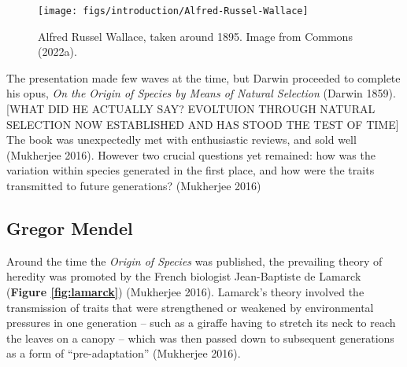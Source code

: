 \documentclass[
]{book}
\begin{document}
\begin{figure}

\texttt{[image: figs/introduction/Alfred-Russel-Wallace]} \hfill{}

\caption{Alfred Russel Wallace, taken around 1895. Image from Commons (2022a).}\label{fig:alfred-wallace}
\end{figure}

The presentation made few waves at the time, but Darwin proceeded to complete his opus, \emph{On the Origin of Species by Means of Natural Selection} (Darwin 1859). {[}WHAT DID HE ACTUALLY SAY? EVOLTUION THROUGH NATURAL SELECTION NOW ESTABLISHED AND HAS STOOD THE TEST OF TIME{]} The book was unexpectedly met with enthusiastic reviews, and sold well (Mukherjee 2016). However two crucial questions yet remained: how was the variation within species generated in the first place, and how were the traits transmitted to future generations? (Mukherjee 2016)

\hypertarget{gregor-mendel}{%
\subsection{Gregor Mendel}\label{gregor-mendel}}

Around the time the \emph{Origin of Species} was published, the prevailing theory of heredity was promoted by the French biologist Jean-Baptiste de Lamarck (\textbf{Figure \ref{fig:lamarck}}) (Mukherjee 2016). Lamarck's theory involved the transmission of traits that were strengthened or weakened by environmental pressures in one generation -- such as a giraffe having to stretch its neck to reach the leaves on a canopy -- which was then passed down to subsequent generations as a form of ``pre-adaptation'' (Mukherjee 2016).
\end{document}
